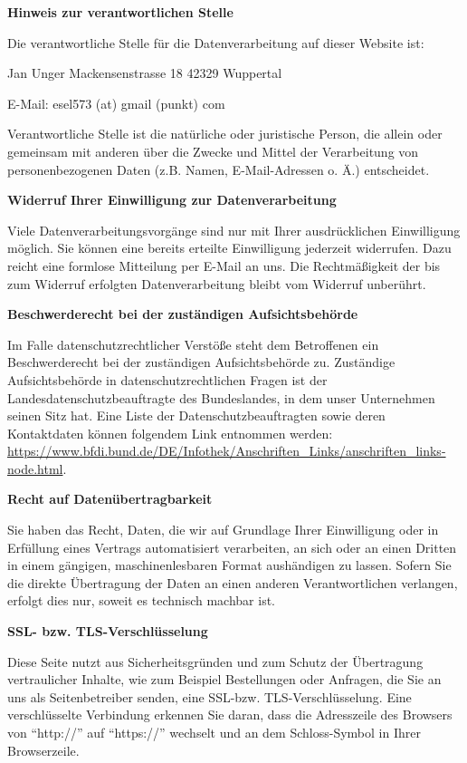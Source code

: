 \documentclass[12pt,a4paper]{scrartcl}
\begin{document}
\textbf{Hinweis zur verantwortlichen Stelle}

Die verantwortliche Stelle für die Datenverarbeitung auf dieser Website
ist:

Jan Unger Mackensenstrasse 18 42329 Wuppertal

E-Mail: esel573 (at) gmail (punkt) com

Verantwortliche Stelle ist die natürliche oder juristische Person, die
allein oder gemeinsam mit anderen über die Zwecke und Mittel der
Verarbeitung von personenbezogenen Daten (z.B. Namen, E-Mail-Adressen o.
Ä.) entscheidet.

\textbf{Widerruf Ihrer Einwilligung zur Datenverarbeitung}

Viele Datenverarbeitungsvorgänge sind nur mit Ihrer ausdrücklichen
Einwilligung möglich. Sie können eine bereits erteilte Einwilligung
jederzeit widerrufen. Dazu reicht eine formlose Mitteilung per E-Mail an
uns. Die Rechtmäßigkeit der bis zum Widerruf erfolgten Datenverarbeitung
bleibt vom Widerruf unberührt.

\textbf{Beschwerderecht bei der zuständigen Aufsichtsbehörde}

Im Falle datenschutzrechtlicher Verstöße steht dem Betroffenen ein
Beschwerderecht bei der zuständigen Aufsichtsbehörde zu. Zuständige
Aufsichtsbehörde in datenschutzrechtlichen Fragen ist der
Landesdatenschutzbeauftragte des Bundeslandes, in dem unser Unternehmen
seinen Sitz hat. Eine Liste der Datenschutzbeauftragten sowie deren
Kontaktdaten können folgendem Link entnommen werden:
\url{https://www.bfdi.bund.de/DE/Infothek/Anschriften_Links/anschriften_links-node.html}.

\textbf{Recht auf Datenübertragbarkeit}

Sie haben das Recht, Daten, die wir auf Grundlage Ihrer Einwilligung
oder in Erfüllung eines Vertrags automatisiert verarbeiten, an sich oder
an einen Dritten in einem gängigen, maschinenlesbaren Format aushändigen
zu lassen. Sofern Sie die direkte Übertragung der Daten an einen anderen
Verantwortlichen verlangen, erfolgt dies nur, soweit es technisch
machbar ist.

\textbf{SSL- bzw. TLS-Verschlüsselung}

Diese Seite nutzt aus Sicherheitsgründen und zum Schutz der Übertragung
vertraulicher Inhalte, wie zum Beispiel Bestellungen oder Anfragen, die
Sie an uns als Seitenbetreiber senden, eine SSL-bzw.
TLS-Verschlüsselung. Eine verschlüsselte Verbindung erkennen Sie daran,
dass die Adresszeile des Browsers von ``http://'' auf ``https://''
wechselt und an dem Schloss-Symbol in Ihrer Browserzeile.
\end{document}
